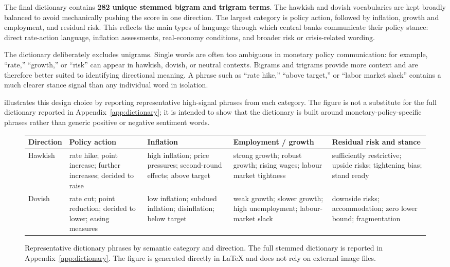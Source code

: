The final dictionary contains \textbf{282 unique stemmed bigram and
trigram terms}. The hawkish and dovish vocabularies are kept broadly
balanced to avoid mechanically pushing the score in one direction.
The largest category is policy action, followed by inflation, growth
and employment, and residual risk. This reflects the main types of
language through which central banks communicate their policy stance:
direct rate-action language, inflation assessments, real-economy
conditions, and broader risk or crisis-related wording.

The dictionary deliberately excludes unigrams. Single words are often
too ambiguous in monetary policy communication: for example,
``rate,'' ``growth,'' or ``risk'' can appear in hawkish, dovish, or
neutral contexts. Bigrams and trigrams provide more context and are
therefore better suited to identifying directional meaning. A phrase
such as ``rate hike,'' ``above target,'' or ``labor market slack''
contains a much clearer stance signal than any individual word in
isolation.

 illustrates this design choice by
reporting representative high-signal phrases from each category. The
figure is not a substitute for the full dictionary reported in
Appendix~\ref{app:dictionary}; it is intended to show that the
dictionary is built around monetary-policy-specific phrases rather
than generic positive or negative sentiment words.

\begin{figure}[htbp]
\centering
\small
\setlength{\tabcolsep}{4pt}
\renewcommand{\arraystretch}{1.12}
\begin{tabularx}{\textwidth}{p{1.7cm}XXXX}
\toprule
Direction & Policy action & Inflation & Employment / growth & Residual risk and stance \\
\midrule
Hawkish &
rate hike; point increase; further increases; decided to raise &
high inflation; price pressures; second-round effects; above target &
strong growth; robust growth; rising wages; labour market tightness &
sufficiently restrictive; upside risks; tightening bias; stand ready \\
\addlinespace
Dovish &
rate cut; point reduction; decided to lower; easing measures &
low inflation; subdued inflation; disinflation; below target &
weak growth; slower growth; high unemployment; labour-market slack &
downside risks; accommodation; zero lower bound; fragmentation \\
\bottomrule
\end{tabularx}
\caption[Representative dictionary phrases by semantic category]{Representative
  dictionary phrases by semantic category and direction. The full stemmed
  dictionary is reported in Appendix~\ref{app:dictionary}. The figure is
  generated directly in LaTeX and does not rely on external image files.}
\label{fig:dict_terms_native}
\end{figure}



